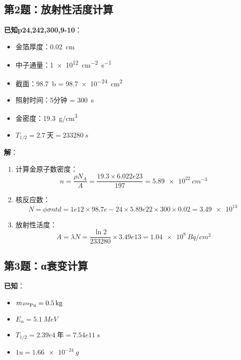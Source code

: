 \documentclass{article}
\begin{document}
\subsection*{第2题：放射性活度计算}
\textbf{已知p24,242,300,9-10}：
\begin{itemize}
  \item 金箔厚度：\SI{0.02}{cm}
  \item 中子通量：\SI{1e12}{cm^{-2}.s^{-1}}
  \item 截面：\SI{98.7}{b} = \SI{98.7e-24}{cm^2}
  \item 照射时间：5分钟 = \SI{300}{s}
  \item 金密度：\SI{19.3}{g/cm^3}
  \item $T_{1/2} = 2.7\ \text{天} = 233280\ \si{s}$
\end{itemize}

\textbf{解}：
\begin{enumerate}
  \item 计算金原子数密度：
  $$
  n = \frac{\rho N_A}{A} = \frac{19.3 \times 6.022e23}{197} = \SI{5.89e22}{cm^{-3}}
  $$
  
  \item 核反应数：
  $$
  N = \phi \sigma n t d = 1e12 \times 98.7e-24 \times 5.89e22 \times 300 \times 0.02 = \SI{3.49e13}{}
  $$
  
  \item 放射性活度：
  $$
  A = \lambda N = \frac{\ln 2}{233280} \times 3.49e13 = \SI{1.04e8}{Bq/cm^2}
  $$
\end{enumerate}

\subsection*{第3题：α衰变计算}
\textbf{已知}：
\begin{itemize}
  \item $m_{\ce{^{239}Pu}} = \SI{0.5}{kg}$
  \item $E_\alpha = \SI{5.1}{MeV}$
  \item $T_{1/2} = 2.39e4\ \text{年} = 7.54e11\ \si{s}$
  \item $1u = \SI{1.66e-24}{g}$
\end{itemize}
\end{document}
